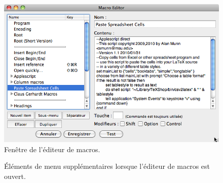 \documentclass[11pt,french]{article}
\newcommand{\TS}{\textsf{\TeX Shop}}
\newcommand{\mnu}[1]{\textsf{#1}}
\newcommand{\To}{\,\(\to\)\,}
\begin{document}
%
\begin{figure}
\centering
\includegraphics[width=4.75in]{figs/editeurmacros}
\caption{Fenêtre de l'éditeur de macros.}
\label{fig:MacroEditorWindow}
\end{figure}
%

\begin{figure}
\centering
{}
\caption{Éléments de menu supplémentaires lorsque l'éditeur de macros est ouvert.\label{fig:MacrosMenu}}
\end{figure}
\end{document}
